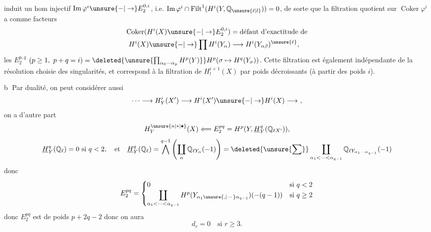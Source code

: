 induit un hom injectif $\operatorname{Im}\varphi^i\unsure{-|\to}E_2^{0,i}$, i.e. $\operatorname{Im}\varphi^i\cap\operatorname{Filt}^1(H^i(Y,\mathbb{Q}_{\unsure{\ell|l}}))=0$, de sorte que  la filtration quotient sur $\operatorname{Coker}\varphi^i$ a comme facteurs 
\[
\begin{aligned}
\operatorname{Coker}(H^i(X)\unsure{-|\to}E_2^{0,i})&=\text{défaut d'exactitude de}\\
H^i(X)\unsure{-|\to}\prod H^i(Y_\alpha)&\longrightarrow H^i(Y_{\alpha\beta})^{\unsure{\ell}},
\end{aligned}
\]
les $E_2^{p,q}$ $(p\geq1,\ p+q=i)=\deleted{\unsure{\prod_{\alpha_0\cdots\alpha_p}H^p(Y)}}H^p(\sigma\mapsto H^q(Y_\sigma))$. Cette filtration est également indépendante de la résolution choisie des singularités, et correspond à la filtration de $H^{i+1}_!(X)$ par poids décroissants (à partir des poids $i$).

\textcircled{b} Par dualité, on peut considérer aussi
\[
\cdots\longrightarrow H_Y^i(X')\longrightarrow H^i(X')\unsure{-|\to}H^i(X)\longrightarrow\ ,
\]
on a d'autre part
\[
H_Y^{\unsure{n|*|\bullet}}(X)\Longleftarrow E_2^{pq}=H^p(Y,\underline H_Y^q(\mathbb{Q}_{\ell X'})),
\]
\[
\underline H_Y^q(\mathbb{Q}_\ell)=0\ \text{si }q<2,\quad\text{et}\quad
\underline H_Y^q(\mathbb{Q}_\ell)=\mathop{\bigwedge}^{q-1}\left(\coprod_\alpha\mathbb{Q}_{\ell Y_\alpha}(-1)\right)=\deleted{\unsure{\sum}}\coprod_{\alpha_1<\cdots<\alpha_{q-1}}\mathbb{Q}_{\ell Y_{\alpha_1\cdots\alpha_{q-1}}}(-1)
\]
donc
\[
E_2^{pq}=\begin{cases}
0&\text{si }q<2\\
\displaystyle\coprod_{\alpha_1<\cdots<\alpha_{q-1}}H^p(Y_{\alpha_1\unsure{,|\cdots}\alpha_{q-1}})(-(q-1))&\text{si }q\geq2
\end{cases}
\]
donc $E_2^{pq}$ est de poids $p+2q-2$ donc on  aura 
\[
d_r=0\quad\text{si }r\geq3.
\]
